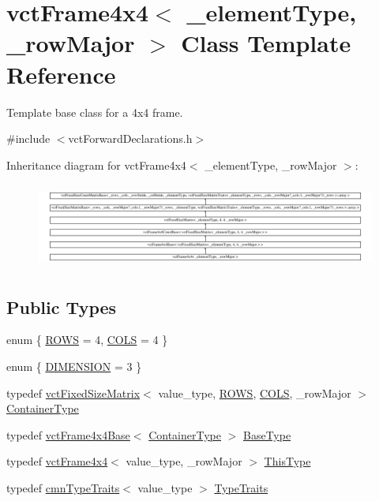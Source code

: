 \hypertarget{classvct_frame4x4}{}\section{vct\+Frame4x4$<$ \+\_\+element\+Type, \+\_\+row\+Major $>$ Class Template Reference}
\label{classvct_frame4x4}


Template base class for a 4x4 frame.  




{\ttfamily \#include $<$vct\+Forward\+Declarations.\+h$>$}

Inheritance diagram for vct\+Frame4x4$<$ \+\_\+element\+Type, \+\_\+row\+Major $>$\+:\begin{figure}[H]
\begin{center}
\leavevmode
\includegraphics[height=2.840237cm]{d7/dc1/classvct_frame4x4}
\end{center}
\end{figure}
\subsection*{Public Types}
\begin{DoxyCompactItemize}
\item 
enum \{ \hyperlink{classvct_frame4x4_ab47fb26bf5a63b1dd8dc3257181103eda76a3fe8d4faebc4fd854e2a2768f7dae}{R\+O\+W\+S} = 4, 
\hyperlink{classvct_frame4x4_ab47fb26bf5a63b1dd8dc3257181103eda7c50eb46d3929353c661aa63859a5b45}{C\+O\+L\+S} = 4
 \}
\item 
enum \{ \hyperlink{classvct_frame4x4_a5e333262820027530265ceadfd397d78aebaa2cdbcc1aa6476cec2fc21749c2cf}{D\+I\+M\+E\+N\+S\+I\+O\+N} = 3
 \}
\item 
typedef \hyperlink{classvct_fixed_size_matrix}{vct\+Fixed\+Size\+Matrix}$<$ value\+\_\+type, \hyperlink{classvct_frame4x4_ab47fb26bf5a63b1dd8dc3257181103eda76a3fe8d4faebc4fd854e2a2768f7dae}{R\+O\+W\+S}, \hyperlink{classvct_frame4x4_ab47fb26bf5a63b1dd8dc3257181103eda7c50eb46d3929353c661aa63859a5b45}{C\+O\+L\+S}, \+\_\+row\+Major $>$ \hyperlink{classvct_frame4x4_a3174a2ddafc9ae2b74009bab0c2b47c4}{Container\+Type}
\item 
typedef \hyperlink{classvct_frame4x4_base}{vct\+Frame4x4\+Base}$<$ \hyperlink{classvct_frame4x4_a3174a2ddafc9ae2b74009bab0c2b47c4}{Container\+Type} $>$ \hyperlink{classvct_frame4x4_aea04715fa9c35ad348f07f24250674a9}{Base\+Type}
\item 
typedef \hyperlink{classvct_frame4x4}{vct\+Frame4x4}$<$ value\+\_\+type, \+\_\+row\+Major $>$ \hyperlink{classvct_frame4x4_ad33a26b915cb65236c0744e2e9937d84}{This\+Type}
\item 
typedef \hyperlink{classcmn_type_traits}{cmn\+Type\+Traits}$<$ value\+\_\+type $>$ \hyperlink{classvct_frame4x4_af8bf02c629bad73636da990ce9106fcf}{Type\+Traits}
\end{DoxyCompactItemize}
